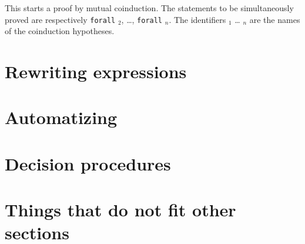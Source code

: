 \begin{coq_example*}
\begin{Variants}
This starts a proof by mutual coinduction. The statements to be
simultaneously proved are respectively {\tt forall}
 {\type}$_2$, {\ldots}, {\tt forall}
   {\type}$_n$. The identifiers
    {\ident}$_1$ {\ldots} {\ident}$_n$ are the names of the
    coinduction hypotheses.

\end{Variants}
























\section{Rewriting expressions}

\section{Automatizing}

\section{Decision procedures}

\section{Things that do not fit other sections}






































\end{coq_example*}
